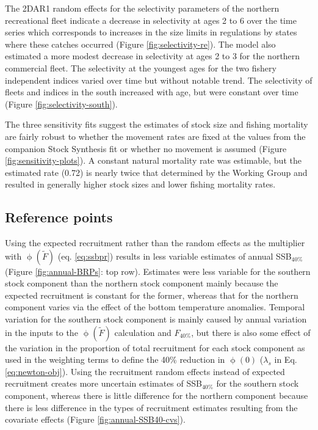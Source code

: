\documentclass[
]{article}
\begin{document}
The 2DAR1 random effects for the selectivity parameters of the northern recreational fleet indicate a decrease in selectivity at ages 2 to 6 over the time series which corresponds to increases in the size limits in regulations by states where these catches occurred (Figure \ref{fig:selectivity-re}). The model also estimated a more modest decrease in selectivity at ages 2 to 3 for the northern commercial fleet. The selectivity at the youngest ages for the two fishery independent indices varied over time but without notable trend. The selectivity of fleets and indices in the south increased with age, but were constant over time (Figure \ref{fig:selectivity-south}).

The three sensitivity fits suggest the estimates of stock size and fishing mortality are fairly robust to whether the movement rates are fixed at the values from the companion Stock Synthesis fit or whether no movement is assumed (Figure \ref{fig:sensitivity-plots}). A constant natural mortality rate was estimable, but the estimated rate (0.72) is nearly twice that determined by the Working Group and resulted in generally higher stock sizes and lower fishing mortality rates.

\hypertarget{reference-points-1}{%
\subsection*{Reference points}\label{reference-points-1}}

Using the expected recruitment rather than the random effects as the multiplier with \(\upphi(\widetilde{F})\) (eq. \ref{eq:ssbpr}) results in less variable estimates of annual SSB\(_{40\%}\) (Figure \ref{fig:annual-BRPs}: top row). Estimates were less variable for the southern stock component than the northern stock component mainly because the expected recruitment is constant for the former, whereas that for the northern component varies via the effect of the bottom temperature anomalies. Temporal variation for the southern stock component is mainly caused by annual variation in the inputs to the \(\upphi(\widetilde{F})\) calculation and \(F_{40\%}\), but there is also some effect of the variation in the proportion of total recruitment for each stock component as used in the weighting terms to define the 40\% reduction in \(\upphi(0)\) (\(\lambda_s\) in Eq. \ref{eq:newton-obj}). Using the recruitment random effects instead of expected recruitment creates more uncertain estimates of SSB\(_{40\%}\) for the southern stock component, whereas there is little difference for the northern component because there is less difference in the types of recruitment estimates resulting from the covariate effects (Figure \ref{fig:annual-SSB40-cvs}).
\end{document}
